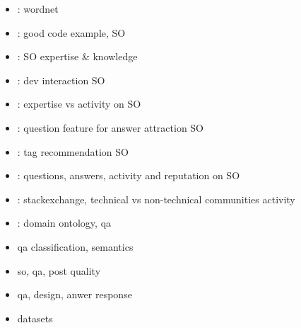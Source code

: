 \begin{itemize}
	\item \cite{Miller1995}: wordnet	
	\item \cite{NasehiSillitoMaurerEtAl2012}: good code example, SO
	\item \cite{HanrahanConvertinoNelson2012}: SO expertise \& knowledge
	\item \cite{WangLoJiang2013}: dev interaction SO
	\item \cite{YangTaoBozzonEtAl2014}: expertise vs activity on SO
	\item \cite{ChengSchiffWu2013}: question feature for answer attraction SO
	\item \cite{ShortWongZeng2014}: tag recommendation SO
	\item \cite{PosnettWarburgDevanbuEtAl2012}: questions, answers, activity and reputation on SO
	\item \cite{AhmedYangJohri2015}: stackexchange, technical vs non-technical communities activity
	\item \cite{FuJiaXu2008}: domain ontology, qa
	\item \cite{LiRoth2002,LiRoth,LiRothSmall} qa classification, semantics
	\item \cite{AndersonHuttenlocherKleinbergEtAl2012} so, qa, post quality	
	\item \cite{SinhaManiGupta2013} qa, design, anwer response	
	\item \cite{Klein2016,SpaceMachine.net2016,Wissner-Gross2016} datasets
\end{itemize}

